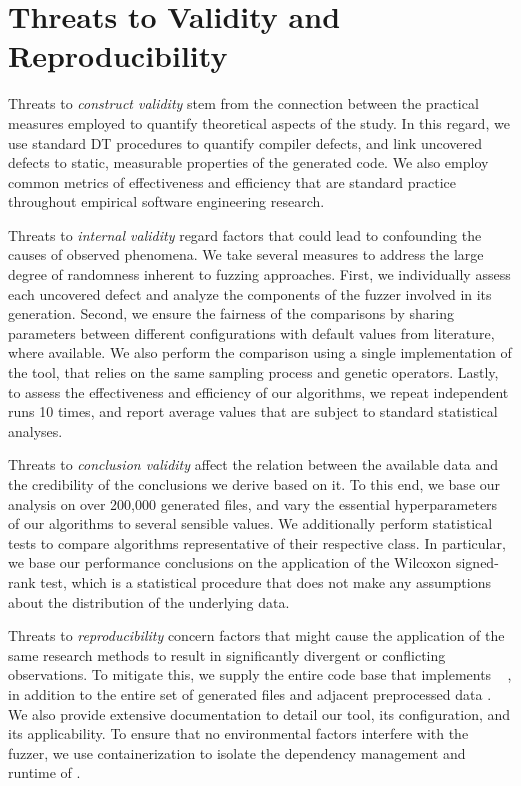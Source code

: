\section{\label{sec:threats}Threats to Validity and Reproducibility}

Threats to \textit{construct validity} stem from the connection between 
the practical measures employed to quantify theoretical aspects of the study.
In this regard, we use standard \gls{DT} procedures to quantify
compiler defects, and link uncovered defects to static, measurable properties of
the generated code.
We also employ common metrics of effectiveness and efficiency that
are standard practice throughout empirical software engineering research.

Threats to \textit{internal validity} regard factors that could lead
to confounding the causes of observed phenomena.
We take several measures to address the large degree of randomness
inherent to fuzzing approaches.
First, we individually assess each uncovered defect
and analyze the components of the fuzzer involved in its generation.
Second, we ensure the fairness of
the comparisons by sharing parameters
between different configurations with
default values from literature, where available.
We also perform the comparison using a single implementation
of the tool, that relies on the same sampling process and genetic operators.
Lastly, to assess the effectiveness and efficiency of our algorithms,
we repeat independent runs 10 times, and report average values
that are subject to standard statistical analyses.

Threats to \textit{conclusion validity} affect the relation between the available data
and the credibility of the conclusions we derive based on it.
To this end, we base our analysis on over 200,000 generated files,
and vary the essential hyperparameters of our algorithms to several
sensible values.
We additionally perform statistical tests to compare algorithms representative
of their respective class.
In particular, we base our performance conclusions on
the application of the Wilcoxon signed-rank test, which
is a statistical procedure that does not make any assumptions
about the distribution of the underlying data.

Threats to \textit{reproducibility} concern factors that might cause the application
of the same research methods to result in significantly divergent or conflicting observations.
To mitigate this, we supply the entire code base that implements \kf~ \cite{kotfuzz-impl},
in addition to the entire set of generated files and adjacent preprocessed data \cite{kotfuzz-data}.
We also provide extensive documentation
to detail our tool, its configuration, and its applicability.
To ensure that no environmental factors interfere with the fuzzer,
we use containerization to isolate the dependency management and runtime of \kf.

